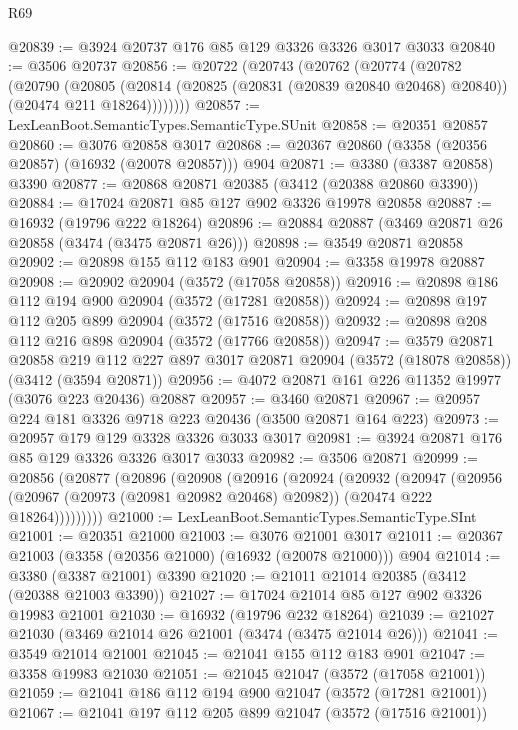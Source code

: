 \begin{lexlean}{R69}
\begin{coremodule}
@20839 := @3924 @20737 @176 @85 @129 @3326 @3326 @3017 @3033
@20840 := @3506 @20737
@20856 := @20722
    (@20743
      (@20762
        (@20774
          (@20782
            (@20790
              (@20805
                (@20814 (@20825 (@20831 (@20839 @20840 @20468) @20840)) (@20474 @211 @18264))))))))
@20857 := LexLeanBoot.SemanticTypes.SemanticType.SUnit
@20858 := @20351 @20857
@20860 := @3076 @20858 @3017
@20868 := @20367 @20860 (@3358 (@20356 @20857) (@16932 (@20078 @20857))) @904
@20871 := @3380 (@3387 @20858) @3390
@20877 := @20868 @20871 @20385 (@3412 (@20388 @20860 @3390))
@20884 := @17024 @20871 @85 @127 @902 @3326 @19978 @20858
@20887 := @16932 (@19796 @222 @18264)
@20896 := @20884 @20887 (@3469 @20871 @26 @20858 (@3474 (@3475 @20871 @26)))
@20898 := @3549 @20871 @20858
@20902 := @20898 @155 @112 @183 @901
@20904 := @3358 @19978 @20887
@20908 := @20902 @20904 (@3572 (@17058 @20858))
@20916 := @20898 @186 @112 @194 @900 @20904 (@3572 (@17281 @20858))
@20924 := @20898 @197 @112 @205 @899 @20904 (@3572 (@17516 @20858))
@20932 := @20898 @208 @112 @216 @898 @20904 (@3572 (@17766 @20858))
@20947 := @3579
    @20871
    @20858
    @219
    @112
    @227
    @897
    @3017
    @20871
    @20904
    (@3572 (@18078 @20858))
    (@3412 (@3594 @20871))
@20956 := @4072 @20871 @161 @226 @11352 @19977 (@3076 @223 @20436) @20887
@20957 := @3460 @20871
@20967 := @20957 @224 @181 @3326 @9718 @223 @20436 (@3500 @20871 @164 @223)
@20973 := @20957 @179 @129 @3328 @3326 @3033 @3017
@20981 := @3924 @20871 @176 @85 @129 @3326 @3326 @3017 @3033
@20982 := @3506 @20871
@20999 := @20856
    (@20877
      (@20896
        (@20908
          (@20916
            (@20924
              (@20932
                (@20947
                  (@20956
                    (@20967 (@20973 (@20981 @20982 @20468) @20982))
                    (@20474 @222 @18264)))))))))
@21000 := LexLeanBoot.SemanticTypes.SemanticType.SInt
@21001 := @20351 @21000
@21003 := @3076 @21001 @3017
@21011 := @20367 @21003 (@3358 (@20356 @21000) (@16932 (@20078 @21000))) @904
@21014 := @3380 (@3387 @21001) @3390
@21020 := @21011 @21014 @20385 (@3412 (@20388 @21003 @3390))
@21027 := @17024 @21014 @85 @127 @902 @3326 @19983 @21001
@21030 := @16932 (@19796 @232 @18264)
@21039 := @21027 @21030 (@3469 @21014 @26 @21001 (@3474 (@3475 @21014 @26)))
@21041 := @3549 @21014 @21001
@21045 := @21041 @155 @112 @183 @901
@21047 := @3358 @19983 @21030
@21051 := @21045 @21047 (@3572 (@17058 @21001))
@21059 := @21041 @186 @112 @194 @900 @21047 (@3572 (@17281 @21001))
@21067 := @21041 @197 @112 @205 @899 @21047 (@3572 (@17516 @21001))

\end{coremodule}
\end{lexlean}
